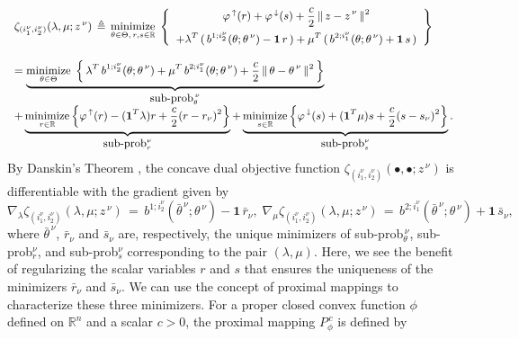 \documentclass{siamart}
\begin{document}
$${\small  \begin{array}{ll}
\zeta_{(i_1^{\nu},i_2^{\nu})}(\lambda,\mu;z^{\, \nu})  \,\triangleq\,  \displaystyle\operatornamewithlimits{\mbox{minimize}}_{\theta\in \Theta, \, r, s\in \mathbb{R}} \;
\left\{ \begin{array}{cc}
\varphi^{\,\uparrow}(r)  + \varphi^{\,\downarrow}(s) + \displaystyle\frac{c}{2}\,\|\,z-z^{\,\nu}\,\|^2\\[0.1in]
+ \lambda^T\,(\, b^{1;i_2^{\nu}}(\theta;\theta^{\, \nu}) - \mathbf{1} \, r\,) + \mu^T \,( \, b^{2;i_1^{\nu}}(\theta;\theta^{\, \nu}) + \mathbf{1} \, s \,)
\end{array}\right\} \\[0.3in]
=  \underbrace{\displaystyle\operatornamewithlimits{\mbox{minimize}}_{\theta\in \Theta} \;
\left\{\, \lambda^T \, b^{1;i_2^{\nu}}(\theta;\theta^{\, \nu}) + \mu^T \, b^{2;i_1^{\nu}}(\theta;\theta^{\, \nu})  +
\frac{c}{2} \, \|\,\theta-\theta^{\,\nu}\,\|^2\,\right\}}_{\mbox{sub-prob}_\theta^{\,\nu}} \\ [0.3in]
 + \underbrace{\displaystyle\operatornamewithlimits{\mbox{minimize}}_{r\in \mathbb{R}} \left\{ \varphi^{\,\uparrow}(r)-(\mathbf{1}^T \lambda) r
+\frac{c}{2}( r - r_{\nu}  )^2\right\}}_{\mbox{sub-prob}_r^\nu}
 +
\underbrace{\displaystyle \operatornamewithlimits{\mbox{minimize}}_{s\in \mathbb{R}} \left\{\varphi^{\,\downarrow}(s) + (\mathbf{1}^T\mu)s+\frac{c}{2}
( s - s_{\nu}  )^2\right\}}_{\mbox{sub-prob}_s^\nu} .
\end{array}}
$$
By Danskin's Theorem \cite[Theorem 10.2.1]{FacchineiPang2003},
the concave dual objective function $\zeta_{(i_1^{\nu},i_2^{\nu})}(\bullet,\bullet;z^{\, \nu})$ is differentiable with the gradient given by
$$
\nabla_\lambda \zeta_{(i_1^{\nu},i_2^{\nu})}(\lambda,\mu;z^{\,\nu}) \, =\, b^{1;i_2^{\nu}}(\bar{\theta}^{\, \nu};\theta^{\, \nu}) - \mathbf{1} \, \bar{r}_{\nu},
\;
\nabla_\mu \zeta_{(i_1^{\nu},i_2^{\nu})}(\lambda,\mu;z^{\,\nu}) \, = \, b^{2;i_1^{\nu}}(\bar{\theta}^{\, \nu};\theta^{\, \nu})+ \mathbf{1} \, \bar{s}_{\nu},
$$
where $\bar{\theta}^{\,\nu}$, $\bar{r}_\nu$ and $\bar{s}_\nu$ are, respectively, the unique minimizers of
sub-prob$_\theta^{\,\nu}$, sub-prob$_r^\nu$, and sub-prob$_s^\nu$ corresponding to the pair $( \lambda,\mu )$.
Here, we see the benefit of regularizing the scalar variables $r$ and $s$ that ensures the uniqueness of the minimizers
$\bar{r}_\nu$ and $\bar{s}_\nu$.  We can use the concept of proximal mappings to characterize these three minimizers.
For a proper closed convex function $\phi$ defined on $\mathbb{R}^n$ and a scalar $c > 0$, the proximal mapping $P^{\,c}_\phi$ is defined by
\end{document}
